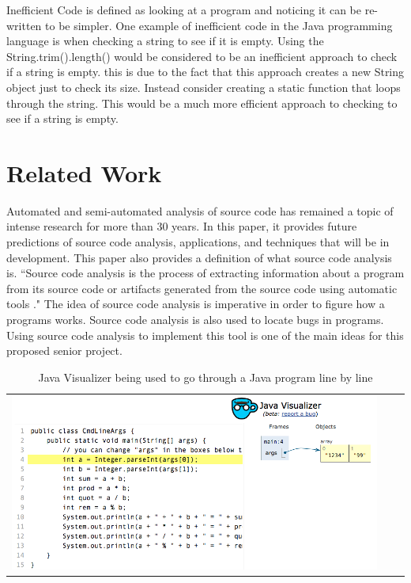  Inefficient Code is defined as looking at a program and noticing it can be re-written to be simpler. One example of inefficient code in the Java programming language is when checking a string to see if it is empty. Using the String.trim().length() would be considered to be an inefficient approach to check if a string is empty. this is due to the fact that this approach creates a new String object just to check its size. Instead consider creating a static function that loops through the string. This would be a much more efficient approach to checking to see if a string is empty. 




\vspace*{-.1in}
\section{Related Work}
\label{sec:relatedwork}
\vspace*{-.1in}

 Automated and semi-automated analysis of source code has remained a topic of intense research for more than 30 years\cite{Binkley}. In this paper, it provides future predictions of source code analysis, applications, and techniques that will be in development. This paper also provides a definition of what source code analysis is. ``Source code analysis is the process of extracting information about a program from its source code or artifacts generated from the source code using automatic tools \cite{Binkley}." The idea of source code analysis is imperative in order to figure how a programs works. Source code analysis is also used to locate bugs in programs. Using  source code analysis to implement this tool is one of the main ideas for this proposed senior project. 


\begin{table}[htbp]
\begin{tabular}{|c|c|c|}
\hline
\includegraphics[scale=0.5]{JavaVisualizer}
\end{tabular}
\caption{Java Visualizer being used to go through a Java program line by line}
\label{tab:jv}
\end{table}

